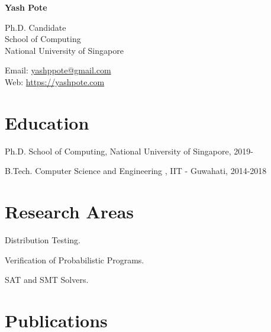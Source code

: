 \documentclass[12pt,letterpaper]{report}
\newcommand{\myname}{Yash Pote}
\newcommand{\namefont}[1]{{\normalfont\bfseries\Huge{#1}}}
\newcommand{\listitemspace}{0.15em}
\renewenvironment{itemize}
{\begin{list}{}{\setlength{\leftmargin}{0em}
            \setlength{\parskip}{0em}
            \setlength{\itemsep}{\listitemspace}
            \setlength{\parsep}{\listitemspace}}}
    {\end{list}}
\begin{document}
    \raggedright

    \namefont{\myname}

    \vspace{1em}
    \begin{minipage}[t]{0.68\textwidth}
    	Ph.D. Candidate \\
        School of Computing \\
		National University of Singapore
    \end{minipage}
    \begin{minipage}[t]{0.31\textwidth}
        Email: \href{mailto:yashppote@gmail.com}{yashppote@gmail.com} \\
        Web: \href{https://yashpote.com}{https://yashpote.com}
    \end{minipage}
    \vspace{0.5em}



    \section*{Education}

    \begin{tablist}

        \item[Ph.D.] \tab School of Computing, National University of Singapore, 2019-

        \item[B.Tech.]  \tab Computer Science and Engineering , IIT - Guwahati, 2014-2018
    \end{tablist}


    \section*{Research Areas}

    \begin{itemize}

	\item Distribution Testing.
	\item Verification of Probabilistic Programs.
	\item SAT and SMT Solvers. 
	
    \end{itemize}



    \section*{Publications}
\end{document}
